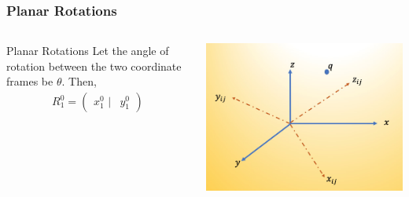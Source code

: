 \begin{frame}
	\frametitle{Planar Rotations}
	\begin{columns}[]
		\begin{column}{.5\linewidth}
			\begin{block}{Planar Rotations}
				Let the angle of rotation between the two coordinate frames be $\theta$. Then,
			\begin{align}
				R_1^0 = \left(\begin{array}{cc}
					x_1^0 \,\,| & y_1^0
				\end{array}\right)
			\end{align}
			\end{block}
		\end{column}
		\begin{column}{.5\linewidth}
			\centering
			\includegraphics[width=\textwidth]{../Notes/figures/rotation_illus.jpg}
		\end{column}
	\end{columns}
	

\end{frame}
